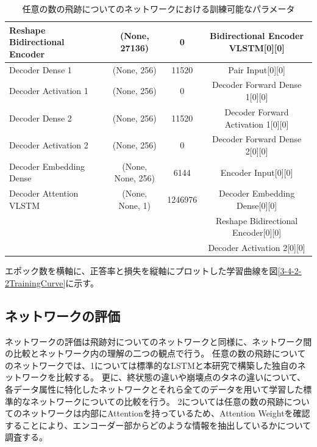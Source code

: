\begin{table}[htb]
{\begin{tabular}{l c c c}
    Reshape Bidirectional Encoder & (None, 27136) & 0 & Bidirectional Encoder VLSTM[0][0]\\\hline\hline
    Decoder Dense 1 & (None, 256)　& 11520 & Pair Input[0][0]\\\hline
    Decoder Activation 1 & (None, 256)　& 0 & Decoder Forward Dense 1[0][0]\\\hline
    Decoder Dense 2 & (None, 256)　& 11520 & Decoder Forward Activation 1[0][0]\\\hline
    Decoder Activation 2 & (None, 256)　& 0 & Decoder Forward Dense 2[0][0]\\\hline\hline
    Decoder Embedding Dense & (None, None, 256) & 6144 & Encoder Input[0][0]\\\hline\hline
    Decoder Attention VLSTM & (None, None, 1) & 1246976 & Decoder Embedding Dense[0][0]\\
                                                                                                   &&& Reshape Bidirectional Encoder[0][0]\\                    
                                                                                                   &&& Decoder Activation 2[0][0]\\\hline\hline
  \end{tabular}
  }
  \caption{任意の数の飛跡についてのネットワークにおける訓練可能なパラメータ}
  \label{ParametersforVLSTMModel}
\end{table}

エポック数を横軸に、正答率と損失を縦軸にプロットした学習曲線を図\ref{3-4-2-2TrainingCurve}に示す。



\subsection{ネットワークの評価} \label{Net:VLSTM:PerformanceofVLSTM}

ネットワークの評価は飛跡対についてのネットワークと同様に、ネットワーク間の比較とネットワーク内の理解の二つの観点で行う。
任意の数の飛跡についてのネットワークでは、1については標準的なLSTMと本研究で構築した独自のネットワークを比較する。
更に、終状態の違いや崩壊点のタネの違いについて、各データ属性に特化したネットワークとそれら全てのデータを用いて学習した標準的なネットワークについての比較を行う。
2については任意の数の飛跡についてのネットワークは内部にAttentionを持っているため、Attention Weightを確認することにより、エンコーダー部からどのような情報を抽出しているかについて調査する。\\

